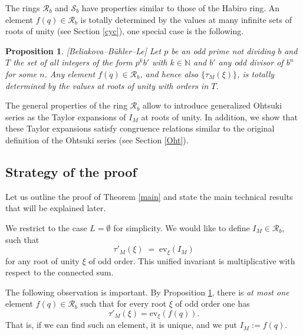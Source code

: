 \documentclass[12pt]{amsart}
\theoremstyle{plain}
\newtheorem{proposition}[Thm]{Proposition}%
\theoremstyle{definition}
\def\cR{\mathcal R}
\def\N{{\mathbb N}}
\def\R{\mathcal R}
\def\calS{\mathcal S}
\def\bj{{\mathbf j}}
\def\bj{{\mathbf j}}
\def\ev{\mathrm{ev}}
\begin{document}
The rings $\R_b$ and $\calS_b$ have properties
 similar  to those of the Habiro ring.
An element $f(q) \in \R_b$ is totally determined by the values at many
infinite sets of roots of unity (see Section \ref{cyc}),
one special case is the following.

\begin{proposition}\label{main-cor} {\rm [Beliakova--B\"uhler--Le]}
Let $p$ be an odd prime
not dividing $b$ and $T$ the set of all integers of the form
$p^k b'$ with $k\in \N$ and $b'$ any odd divisor of
$b^n$ for some $n$. Any element $f(q) \in \R_b$, and hence also
$\{\tau_M(\xi)\}$, is totally determined by the values at roots of
unity with orders in $T$.
\end{proposition}


The general properties of the ring $\R_b$
allow to introduce generalized
 Ohtsuki series as the Taylor expansions
of $I_M$ at roots of unity. In addition, we show
 that these Taylor expansions satisfy
congruence relations similar to the original definition of the Ohtsuki
series (see Section \ref{Oht}).






\subsection{Strategy of the proof}
Let us outline the proof of Theorem \ref{main} and state the main
technical results that will be explained later.



We restrict to the case $L=\emptyset$ for simplicity.
We would like to define $I_{M}\in \cR_{b}$, such that
\begin{equation}
\tau'_{M}(\xi)\;=\; \ev_{\xi}\left(I_{M}\right)
\label{0080}
\end{equation}
for any root of unity $\xi$ of odd order.
This unified invariant is multiplicative with respect
to the connected sum.


The following observation is important.
By Proposition \ref{main-cor}, there is {\em at most one} element $f(q)\in \R_b$  such that for every root $\xi$ of odd order one has
$$ \tau'_{M} (\xi) = \ev_\xi\left( f(q)\right).$$
That is, if  we can find such an element,
 it is unique, and we put
$I_{M} := f(q)$.
\end{document}
